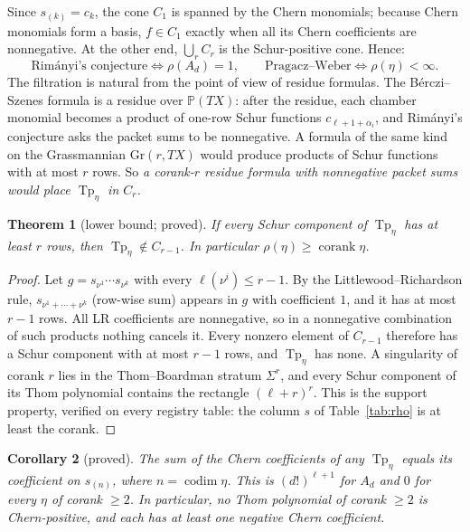 \documentclass[11pt,a4paper]{article}
\DeclareMathOperator{\Tp}{Tp}
\theoremstyle{plain}
\newtheorem{theorem}{Theorem}
\newtheorem{corollary}[theorem]{Corollary}
\theoremstyle{definition}
\theoremstyle{remark}
\begin{document}
Since $s_{(k)} = c_k$, the cone $C_1$ is spanned by the Chern monomials; because Chern monomials
form a basis, $f \in C_1$ exactly when all its Chern coefficients are nonnegative. At the other end,
$\bigcup_r C_r$ is the Schur-positive cone. Hence:
\[
  \text{Rim\'anyi's conjecture} \iff \rho(A_d) = 1,
  \qquad
  \text{Pragacz--Weber} \iff \rho(\eta) < \infty .
\]
The filtration is natural from the point of view of residue formulas. The B\'erczi--Szenes formula
is a residue over $\mathbb{P}(TX)$: after the residue, each chamber monomial becomes a product of
one-row Schur functions $c_{\ell+1+\alpha_i}$, and Rim\'anyi's conjecture asks the packet sums to
be nonnegative. A formula of the same kind on the Grassmannian $\mathrm{Gr}(r, TX)$ would produce
products of Schur functions with at most $r$ rows. So \emph{a corank-$r$ residue formula with
nonnegative packet sums would place $\Tp_\eta$ in $C_r$.}

\begin{theorem}[lower bound; proved]\label{thm:lower}
If every Schur component of $\Tp_\eta$ has at least $r$ rows, then $\Tp_\eta \notin C_{r-1}$. In
particular $\rho(\eta) \ge \operatorname{corank} \eta$.
\end{theorem}

\begin{proof}
Let $g = s_{\nu^1} \cdots s_{\nu^k}$ with every $\ell(\nu^i) \le r-1$. By the Littlewood--Richardson
rule, $s_{\nu^1+\cdots+\nu^k}$ (row-wise sum) appears in $g$ with coefficient $1$, and it has at
most $r-1$ rows. All LR coefficients are nonnegative, so in a nonnegative combination of such
products nothing cancels it. Every nonzero element of $C_{r-1}$ therefore has a Schur component
with at most $r-1$ rows, and $\Tp_\eta$ has none. A singularity of corank $r$ lies in the
Thom--Boardman stratum $\Sigma^r$, and every Schur component of its Thom polynomial contains the
rectangle $(\ell+r)^r$. This is the support property, verified on every registry table: the column
$s$ of Table~\ref{tab:rho} is at least the corank.
\end{proof}

\begin{corollary}[proved]\label{cor:sum}
The sum of the Chern coefficients of any $\Tp_\eta$ equals its coefficient on $s_{(n)}$, where
$n = \operatorname{codim}\eta$. This is $(d!)^{\ell+1}$ for $A_d$ and $0$ for every $\eta$ of corank
$\ge 2$. In particular, no Thom polynomial of corank $\ge 2$ is Chern-positive, and each has at
least one negative Chern coefficient.
\end{corollary}
\end{document}
